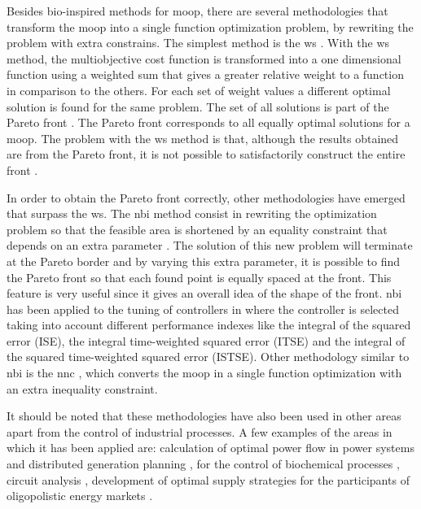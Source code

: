 Besides bio-inspired methods for \gls{moop}, there are several methodologies that transform the \gls{moop} into a single function optimization problem, by rewriting the problem with extra constrains. The simplest method is the \gls{ws} \citep{Marler2004}. With the \gls{ws} method, the multiobjective cost function is transformed into a one dimensional function using a weighted sum that gives a greater relative weight to a function in comparison to the others. For each set of weight values a different optimal solution is found for the same problem. The set of all solutions is part of the Pareto front \citep{Marler2004}. The Pareto front corresponds to all equally optimal solutions for a \gls{moop}. The problem with the \gls{ws} method is that, although the results obtained are from the Pareto front, it is not possible to satisfactorily construct the entire front \citep{Das1997,Messac2000,Marler2010}.

In order to obtain the Pareto front correctly, other methodologies have emerged that surpass the \gls{ws}. The \gls{nbi} method consist in rewriting the optimization problem so that the feasible area is shortened by an equality constraint that depends on an extra parameter \citep{Das1998}. The solution of this new problem will terminate at the Pareto border and by varying this extra parameter, it is possible to find the Pareto front so that each found point is equally spaced at the front. This feature is very useful since it gives an overall idea of the shape of the front. \gls{nbi} has been applied to the tuning of controllers in \citet{Gambier2009} where the controller is selected taking into account different performance indexes like the integral of the squared error (ISE), the integral time-weighted squared error (ITSE) and the integral of the squared time-weighted squared error (ISTSE). Other methodology similar to \gls{nbi} is the \gls{nnc} \citep{Messac2003}, which converts the \gls{moop} in a single function optimization with an extra inequality constraint.

It should be noted that these methodologies have also been used in other areas apart from the control of industrial processes. A few examples of the areas in which it has been applied are: calculation of optimal power flow in power systems \citep{Roman2006}  and distributed generation planning \citep{Zangeneh2007},  for the control of biochemical processes \citep{Logist2009}, circuit analysis \citep{Stehr2003}, development of optimal supply strategies for the participants of oligopolistic energy markets \citep{Vahidinasab2010}.

